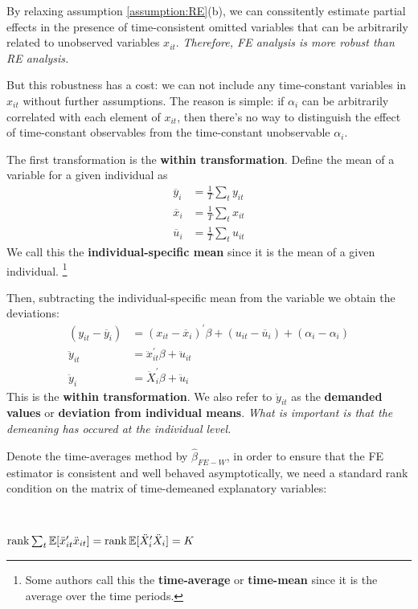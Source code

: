 By relaxing assumption \ref{assumption:RE}(b), we can conssitently estimate partial effects in the presence of time-consistent omitted variables
that can be arbitrarily related to unobserved variables $x_{it}$.
\emph{Therefore, FE analysis is more robust than RE analysis.}

But this robustness has a cost: we can not include any time-constant variables in $x_{it}$ without further assumptions.
The reason is simple: if $\alpha_i$ can be arbitrarily correlated with each element of $x_{it}$, 
then there's no way to distinguish the effect of time-constant observables from the time-constant unobservable $\alpha_i$.

The first transformation is the \textbf{within transformation}.
Deﬁne the mean of a variable for a given individual as
\begin{align*}
    \overline{y}_i &= \frac{1}{T} \sum_t y_{it} \\
    \overline{x}_i &= \frac{1}{T} \sum_t x_{it} \\
    \overline{u}_i &= \frac{1}{T} \sum_t u_{it}
\end{align*}
We call this the \textbf{individual-specific mean} since it is the mean of a given individual. \footnote{Some
authors call this the \textbf{time-average} or \textbf{time-mean} since it is the average over the time periods.}

Then, subtracting the individual-specific mean from the variable we obtain the deviations:
\begin{align*}
    (y_{it} - \overline{y}_i) &= (x_{it} - \overline{x}_i)^{\prime} \beta + (u_{it} -\overline{u}_i) + (\alpha_i - \alpha_i) \\
    \ddot{y}_{it} &= \ddot{x}_{it}^{\prime} \beta + \ddot{u}_{it} \\
    \ddot{y}_i &= \ddot{X}_i^{\prime} \beta + \ddot{u}_i
\end{align*}
This is the \textbf{within transformation}. We also refer to $\ddot{y}_{it}$ as the \textbf{demanded values} or \textbf{deviation from individual means}.
\emph{What is important is that the demeaning has occured at the individual level.}

Denote the time-averages method by $\hat{\beta}_{FE-W}$, in order to ensure that the FE estimator is consistent and 
well behaved asymptotically, we need a standard rank condition on the matrix of time-demeaned explanatory variables:
\begin{assumption}\label{assumption:FE-rank}
    \

    $\operatorname{rank} \sum_{t} \mathbb{E}[\ddot{x}_{it}^{\prime} \ddot{x}_{it}] = \operatorname{rank} \mathbb{E}[\ddot{X}_i^{\prime} \ddot{X}_i] = K$
\end{assumption}

